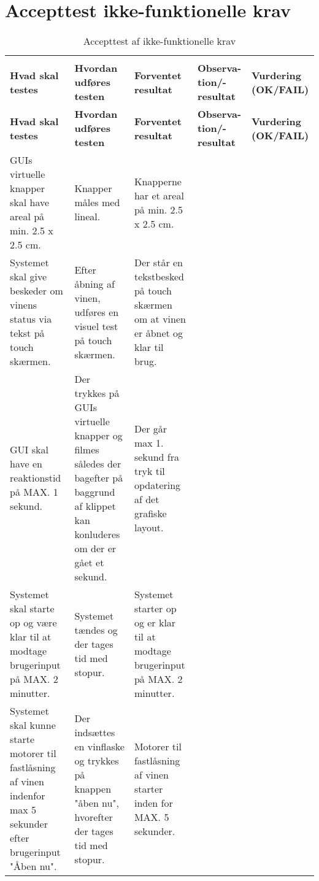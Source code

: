 \section{Accepttest ikke-funktionelle krav}

\begin{longtable}{ p{2cm}  p{2cm}  p{2cm}  p{1.5cm} p{2cm} }
	\rowcolor{white}\caption{Accepttest af ikke-funktionelle krav}
    \label{AT:ikke-funktionelle-krav}\\
	\rowcolor{white}\bfseries{Hvad skal testes} & \bfseries{Hvordan udføres testen}& \bfseries{Forventet resultat} & \bfseries{Observa-tion/-resultat} & \textbf{Vurdering (OK/FAIL)} \\
	\toprule
   \endfirsthead
   \rowcolor{white}
   \bfseries{Hvad skal testes} & \bfseries{Hvordan udføres testen}& \bfseries{Forventet resultat} & \bfseries{Observa-tion/-resultat} & \textbf{Vurdering (OK/FAIL)} \\
   \toprule
   \endhead

    GUIs virtuelle knapper skal have areal på min. 2.5 x 2.5 cm. & Knapper måles med lineal. & Knapperne har et areal på min. 2.5 x 2.5 cm.  & &\\ 
    
    Systemet skal give beskeder om vinens status via tekst på touch skærmen. & Efter åbning af vinen, udføres en visuel test på touch skærmen. & Der står en tekstbesked på touch skærmen om at vinen er åbnet og klar til brug. & &\\
    
    GUI skal have en reaktionstid på MAX. 1 sekund. & Der trykkes på GUIs virtuelle knapper og filmes således der bagefter på baggrund af klippet kan konluderes om der er gået et sekund. & Der går max 1. sekund fra tryk til opdatering af det grafiske layout. & &\\
    
	Systemet skal starte op og være klar til at modtage brugerinput på MAX. 2 minutter.& Systemet tændes og der tages tid med stopur.& Systemet starter op og er klar til at modtage brugerinput på MAX. 2 minutter. & &\\
	
	Systemet skal kunne starte motorer til fastlåsning af vinen indenfor max 5 sekunder efter brugerinput "Åben nu".& Der indsættes en vinflaske og trykkes på knappen "åben nu", hvorefter der tages tid med stopur.& Motorer til fastlåsning af vinen starter inden for MAX. 5 sekunder. & &\\
	

\end{longtable}
